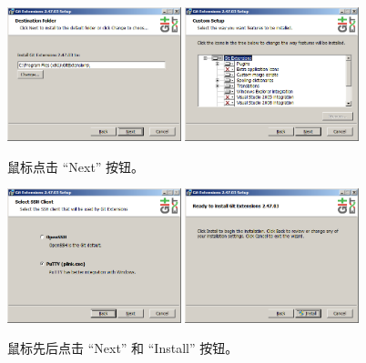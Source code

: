 \documentclass{article}
\begin{document}
\begin{figure}[ht]\centering
  \includegraphics[width=0.45\textwidth]{figures/git/set4.png}
  \includegraphics[width=0.45\textwidth]{figures/git/set5.png}
  \caption{鼠标点击 ``Next'' 按钮。}\label{fig:set4}
\end{figure}


\begin{figure}[ht]\centering
  \includegraphics[width=0.45\textwidth]{figures/git/set6.png}
  \includegraphics[width=0.45\textwidth]{figures/git/set7.png}
  \caption{鼠标先后点击 ``Next'' 和 ``Install'' 按钮。}\label{fig:set6}
\end{figure}
\end{document}
